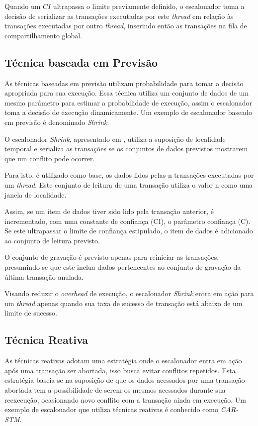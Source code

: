 \documentclass[ti]{texufpel}
\begin{document}
Quando um $CI$ ultrapassa o limite previamente definido, o escalonador toma a decisão de serializar as transações executadas por este \emph{thread} em relação às transações executadas por outro \emph{thread}, inserindo então as transações na fila de compartilhamento global.


\subsection{Técnica baseada em Previsão}

As técnicas baseadas em previsão utilizam probabilidade para tomar a decisão apropriada para sua execução. Essa técnica utiliza um conjunto de dados de um mesmo parâmetro para estimar a probabilidade de execução, assim o escalonador toma a decisão de execução dinamicamente. Um exemplo de escalonador baseado em previsão é denominado \emph{Shrink}.

O escalonador \emph{Shrink}, apresentado em \cite{dragojevic09}, utiliza a suposição de localidade temporal e serializa as transações se os conjuntos de dados previstos mostrarem que um conflito pode ocorrer.

Para isto, é utilizado como base, os dados lidos pelas n transações executadas por um \emph{thread}. Este conjunto de leitura de uma transação utiliza o valor n como uma janela de localidade.

Assim, se um item de dados tiver sido lido pela transação anterior, é incrementado, com uma constante de confiança (CI), o parâmetro confiança (C). Se este ultrapassar o limite de confiança estipulado, o item de dados é adicionado ao conjunto de leitura previsto.

O conjunto de gravação é previsto apenas para reiniciar as transações, presumindo-se que este inclua dados pertencentes ao conjunto de gravação da última transação anulada.

Visando reduzir o \emph{overhead} de execução, o escalonador \emph{Shrink} entra em ação para um \emph{thread} apenas quando sua taxa de sucesso de transação está abaixo de um limite de sucesso.


\subsection{Técnica Reativa}

As técnicas reativas adotam uma estratégia onde o escalonador entra em ação após uma transação ser abortada, isso busca evitar conflitos repetidos. Esta estratégia baseia-se na suposição de que os dados acessados por uma transação abortada tem a possibilidade de serem os mesmos acessados durante sua reexecução, ocasionando novo conflito com a transação ainda em execução. Um exemplo de escalonador que utiliza técnicas reativas é conhecido como \emph{CAR-STM}.
\end{document}
